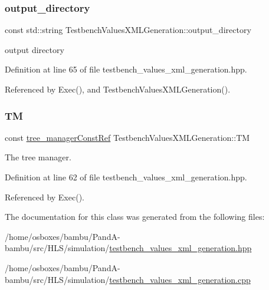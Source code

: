 \subsubsection{\texorpdfstring{output\+\_\+directory}{output\_directory}}
{\footnotesize\ttfamily const std\+::string Testbench\+Values\+X\+M\+L\+Generation\+::output\+\_\+directory\hspace{0.3cm}{\ttfamily [protected]}}



output directory 



Definition at line 65 of file testbench\+\_\+values\+\_\+xml\+\_\+generation.\+hpp.



Referenced by Exec(), and Testbench\+Values\+X\+M\+L\+Generation().

\mbox{\label{classTestbenchValuesXMLGeneration_ad30e7f826dc916e3eaebc4b2a7908516}} 
\subsubsection{\texorpdfstring{TM}{TM}}
{\footnotesize\ttfamily const \hyperlink{tree__manager_8hpp_a792e3f1f892d7d997a8d8a4a12e39346}{tree\+\_\+manager\+Const\+Ref} Testbench\+Values\+X\+M\+L\+Generation\+::\+TM\hspace{0.3cm}{\ttfamily [protected]}}



The tree manager. 



Definition at line 62 of file testbench\+\_\+values\+\_\+xml\+\_\+generation.\+hpp.



Referenced by Exec().



The documentation for this class was generated from the following files\+:\begin{DoxyCompactItemize}
\item 
/home/osboxes/bambu/\+Pand\+A-\/bambu/src/\+H\+L\+S/simulation/\hyperlink{testbench__values__xml__generation_8hpp}{testbench\+\_\+values\+\_\+xml\+\_\+generation.\+hpp}\item 
/home/osboxes/bambu/\+Pand\+A-\/bambu/src/\+H\+L\+S/simulation/\hyperlink{testbench__values__xml__generation_8cpp}{testbench\+\_\+values\+\_\+xml\+\_\+generation.\+cpp}\end{DoxyCompactItemize}
